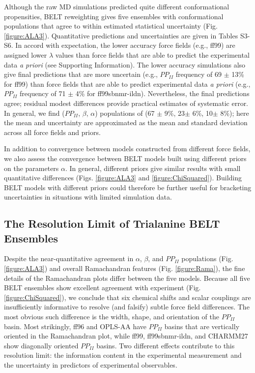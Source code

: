 \documentclass[journal=jacsat,manuscript=article]{achemso}
\begin{document}
Although the raw MD simulations predicted quite different conformational propensities, BELT reweighting gives five ensembles with conformational populations that agree to within estimated statistical uncertainty (Fig. \ref{figure:ALA3}).  Quantitative predictions and uncertainties are given in Tables S3-S6.  In accord with expectation, the lower accuracy force fields (e.g., ff99) are assigned lower $\lambda$ values than force fields that are able to predict the experimental data {\it a priori} (see Supporting Information). The lower accuracy simulations also give final predictions that are more uncertain (e.g., $PP_{II}$ frequency of 69 $\pm$ 13\% for ff99) than force fields that are able to predict experimental data {\it a priori} (e.g., $PP_{II}$ frequency of 71 $\pm$ 4\% for ff99sbnmr-ildn). Nevertheless, the final predictions agree; residual modest differences provide practical estimates of systematic error.  In general, we find ($PP_{II}$, $\beta$, $\alpha$) populations of (67 $\pm$ 9\%, 23$\pm$ 6\%, 
10$\pm$ 8\%); here the mean and uncertainty are approximated as the mean and standard deviation across all force fields and priors. 

In addition to convergence between models constructed from different force fields, we also assess the convergence between BELT models built using different priors on the parameters $\alpha$.  In general, different priors give similar results with small quantitative differences (Figs. \ref{figure:ALA3} and \ref{figure:ChiSquared}).  Building BELT models with different priors could therefore be further useful for bracketing uncertainties in situations with limited simulation data.  

\subsection*{The Resolution Limit of Trialanine BELT Ensembles}

Despite the near-quantitative agreement in $\alpha$, $\beta$, and $PP_{II}$ populations (Fig. \ref{figure:ALA3}) and overall Ramachandran features (Fig. \ref{figure:Rama}), the fine details of the Ramachandran plots differ between the five models.  Because all five BELT ensembles show excellent agreement with experiment (Fig. \ref{figure:ChiSquared}), we conclude that six chemical shifts and scalar couplings are insufficiently informative to resolve (and falsify) subtle force field differences.  The most obvious such difference is the width, shape, and orientation of the $PP_{II}$ basin.  Most strikingly, ff96 and OPLS-AA have $PP_{II}$ basins that are vertically oriented in the Ramachandran plot, while ff99, ff99sbnmr-ildn, and CHARMM27 show diagonally oriented $PP_{II}$ basins.  Two different effects contribute to this resolution limit: the information content in the experimental measurement and the uncertainty in predictors of experimental observables.
\end{document}
